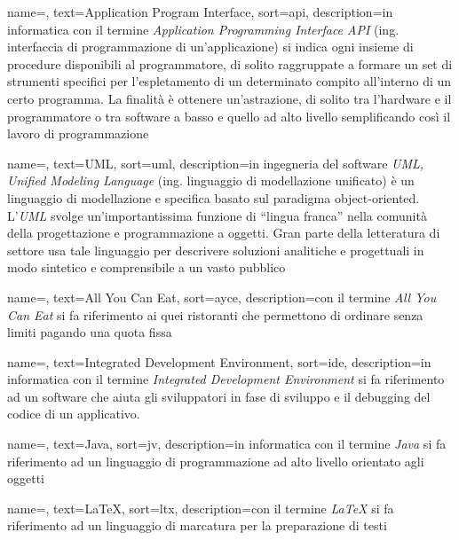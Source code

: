 



{
    name=,
    text=Application Program Interface,
    sort=api,
    description={in informatica con il termine \emph{Application Programming Interface API} (ing. interfaccia di programmazione di un'applicazione) si indica ogni insieme di procedure disponibili al programmatore, di solito raggruppate a formare un set di strumenti specifici per l'espletamento di un determinato compito all'interno di un certo programma. La finalità è ottenere un'astrazione, di solito tra l'hardware e il programmatore o tra software a basso e quello ad alto livello semplificando così il lavoro di programmazione}
}

{
    name=,
    text=UML,
    sort=uml,
    description={in ingegneria del software \emph{UML, Unified Modeling Language} (ing. linguaggio di modellazione unificato) è un linguaggio di modellazione e specifica basato sul paradigma object-oriented. L'\emph{UML} svolge un'importantissima funzione di ``lingua franca'' nella comunità della progettazione e programmazione a oggetti. Gran parte della letteratura di settore usa tale linguaggio per descrivere soluzioni analitiche e progettuali in modo sintetico e comprensibile a un vasto pubblico}
}

{
    name=,
    text=All You Can Eat,
    sort=ayce,
    description={con il termine \textit{All You Can Eat} si fa riferimento ai quei ristoranti che permettono di ordinare senza limiti pagando una quota fissa}
}

{
    name=,
    text=Integrated Development Environment,
    sort=ide,
    description={in informatica con il termine \textit{Integrated Development Environment} si fa riferimento ad un software che aiuta gli sviluppatori in fase di sviluppo e il debugging del codice di un applicativo.}
}

{
  name=,
  text=Java,
  sort=jv,
  description={in informatica con il termine \textit{Java} si fa riferimento ad un linguaggio di programmazione ad alto livello orientato agli oggetti}
}

{
  name=,
  text=LaTeX,
  sort=ltx,
  description={con il termine \textit{LaTeX} si fa riferimento ad un linguaggio di marcatura per la preparazione di testi}
}
